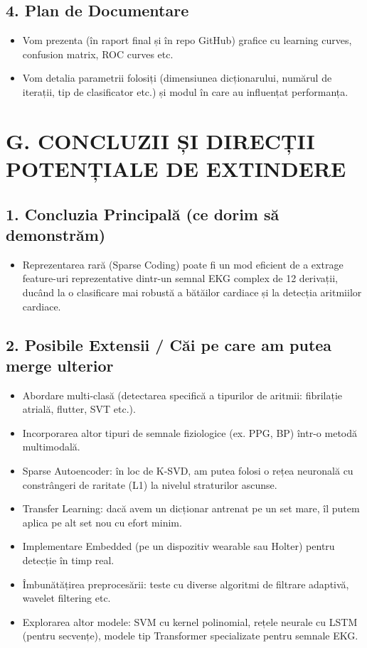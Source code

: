 \documentclass[12pt]{article}
\begin{document}
\subsection*{4. Plan de Documentare}
\begin{itemize}
    \item Vom prezenta (în raport final și în repo GitHub) grafice cu learning curves, confusion matrix, ROC curves etc.
    \item Vom detalia parametrii folosiți (dimensiunea dicționarului, numărul de iterații, tip de clasificator etc.) și modul în care au influențat performanța.
\end{itemize}

\section{G. CONCLUZII ȘI DIRECȚII POTENȚIALE DE EXTINDERE}

\subsection*{1. Concluzia Principală (ce dorim să demonstrăm)}
\begin{itemize}
    \item Reprezentarea rară (Sparse Coding) poate fi un mod eficient de a extrage feature-uri reprezentative dintr-un semnal EKG complex de 12 derivații, ducând la o clasificare mai robustă a bătăilor cardiace și la detecția aritmiilor cardiace.
\end{itemize}

\subsection*{2. Posibile Extensii / Căi pe care am putea merge ulterior}
\begin{itemize}
    \item Abordare multi-clasă (detectarea specifică a tipurilor de aritmii: fibrilație atrială, flutter, SVT etc.).
    \item Incorporarea altor tipuri de semnale fiziologice (ex. PPG, BP) într-o metodă multimodală.
    \item Sparse Autoencoder: în loc de K-SVD, am putea folosi o rețea neuronală cu constrângeri de raritate (L1) la nivelul straturilor ascunse.
    \item Transfer Learning: dacă avem un dicționar antrenat pe un set mare, îl putem aplica pe alt set nou cu efort minim.
    \item Implementare Embedded (pe un dispozitiv wearable sau Holter) pentru detecție în timp real.
    \item Îmbunătățirea preprocesării: teste cu diverse algoritmi de filtrare adaptivă, wavelet filtering etc.
    \item Explorarea altor modele: SVM cu kernel polinomial, rețele neurale cu LSTM (pentru secvențe), modele tip Transformer specializate pentru semnale EKG.
\end{itemize}
\end{document}
